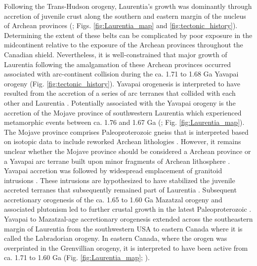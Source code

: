 \documentclass[twocolumn, switch]{article} %
\begin{document}
Following the Trans-Hudson orogeny, Laurentia's growth was dominantly through accretion of juvenile crust along the southern and eastern margin of the nucleus of Archean provinces (\citealp{Whitmeyer2007a}; Figs. \ref{fig:Laurentia_map} and \ref{fig:tectonic_history}). Determining the extent of these belts can be complicated by poor exposure in the midcontinent relative to the exposure of the Archean provinces throughout the Canadian shield. Nevertheless, it is well-constrained that major growth of Laurentia following the amalgamation of these Archean provinces occurred associated with arc-continent collision during the ca. 1.71 to 1.68 Ga Yavapai orogeny (Fig. \ref{fig:tectonic_history}). Yavapai orogenesis is interpreted to have resulted from the accretion of a series of arc terranes that collided with each other and Laurentia \citep{Karlstrom2001a}. Potentially associated with the Yavapai orogeny is the accretion of the Mojave province of southwestern Laurentia which experienced metamorphic events between ca. 1.76 and 1.67 Ga (\citealp{Strickland2013a}; Fig. \ref{fig:Laurentia_map}). The Mojave province comprises Paleoproterozoic gneiss that is interpreted based on isotopic data to include reworked Archean lithologies \citep{Bennett1987a}. However, it remains unclear whether the Mojave province should be considered a Archean province or a Yavapai arc terrane built upon minor fragments of Archean lithosphere \citep{Whitmeyer2007a}. Yavapai accretion was followed by widespread emplacement of granitoid intrusions \citep{Whitmeyer2007a}. These intrusions are hypothesized to have stabilized the juvenile accreted terranes that subsequently remained part of Laurentia \citep{Whitmeyer2007a}. Subsequent accretionary orogenesis of the ca. 1.65 to 1.60 Ga Mazatzal orogeny and associated plutonism led to further crustal growth in the latest Paleoproterozoic \citep{Karlstrom1988a}. Yavapai to Mazatzal-age accretionary orogenesis extended across the southeastern margin of Laurentia from the southwestern USA to eastern Canada where it is called the Labradorian orogeny. In eastern Canada, where the orogen was overprinted in the Grenvillian orogeny, it is interpreted to have been active from ca. 1.71 to 1.60 Ga (Fig. \ref{fig:Laurentia_map}; \citealp{Gower1992a, Gower2008b}). 
\end{document}

